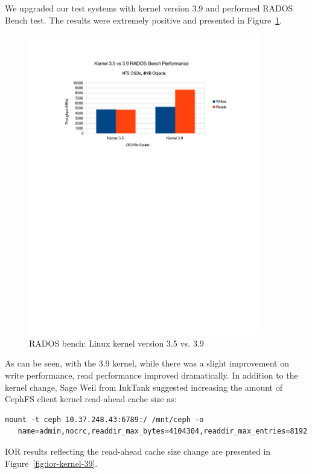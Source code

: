 \documentclass{article}
\begin{document}
We upgraded our test systems with kernel version 3.9 and performed RADOS Bench
test.  The results were extremely positive and presented in
Figure~\ref{fig:rados-kernel}.


\begin{figure}[htb]
\centering
\includegraphics[width=4in]{rados-kernel-35vs39}
\caption{RADOS bench: Linux kernel version 3.5 vs. 3.9}
\label{fig:rados-kernel}
\end{figure}



As can be seen, with the 3.9 kernel, while there was a slight improvement on
write performance, read performance improved dramatically.  In addition to the
kernel change, Sage Weil from InkTank suggested increasing the amount of CephFS
client kernel read-ahead cache size as:

\begin{Verbatim}[samepage=true]
mount -t ceph 10.37.248.43:6789:/ /mnt/ceph -o
   name=admin,nocrc,readdir_max_bytes=4104304,readdir_max_entries=8192
\end{Verbatim}


IOR results reflecting the read-ahead cache size change are presented in
Figure~\ref{fig:ior-kernel-39}.
\end{document}
